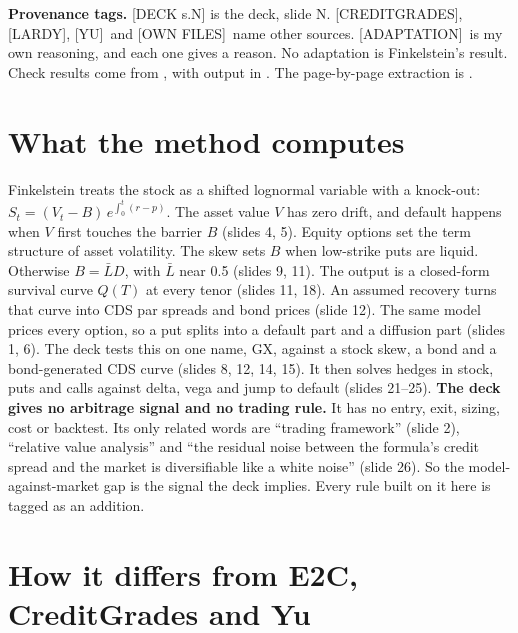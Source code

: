\documentclass[10pt,a4paper]{article}
\newcommand{\DECK}[1]{\textsf{\footnotesize\textcolor{tagdeck}{[DECK s.#1]}}}
\newcommand{\CG}{\textsf{\footnotesize\textcolor{tagother}{[CREDITGRADES]}}}
\newcommand{\LARDY}{\textsf{\footnotesize\textcolor{tagother}{[LARDY]}}}
\newcommand{\YU}{\textsf{\footnotesize\textcolor{tagother}{[YU]}}}
\newcommand{\OWN}{\textsf{\footnotesize\textcolor{tagother}{[OWN FILES]}}}
\newcommand{\ADAPT}{\textsf{\footnotesize\textcolor{tagadapt}{[ADAPTATION]}}}
\newcommand{\Lbar}{\bar{L}}
\begin{document}
\textbf{Provenance tags.} \DECK{N} is the deck, slide N. \CG, \LARDY, \YU\ and \OWN\ name other sources. \ADAPT\ is my own reasoning, and each one gives a reason. No adaptation is Finkelstein's result. Check results come from , with output in . The page-by-page extraction is .

\section{What the method computes}\label{sec:what}

Finkelstein treats the stock as a shifted lognormal variable with a knock-out: $S_t=(V_t-B)\,e^{\int_0^t(r-p)}$. The asset value $V$ has zero drift, and default happens when $V$ first touches the barrier $B$ (slides 4, 5). Equity options set the term structure of asset volatility. The skew sets $B$ when low-strike puts are liquid. Otherwise $B=\Lbar D$, with $\Lbar$ near 0.5 (slides 9, 11). The output is a closed-form survival curve $Q(T)$ at every tenor (slides 11, 18). An assumed recovery turns that curve into CDS par spreads and bond prices (slide 12). The same model prices every option, so a put splits into a default part and a diffusion part (slides 1, 6). The deck tests this on one name, GX, against a stock skew, a bond and a bond-generated CDS curve (slides 8, 12, 14, 15). It then solves hedges in stock, puts and calls against delta, vega and jump to default (slides 21--25). \textbf{The deck gives no arbitrage signal and no trading rule.} It has no entry, exit, sizing, cost or backtest. Its only related words are ``trading framework'' (slide 2), ``relative value analysis'' and ``the residual noise between the formula's credit spread and the market is diversifiable like a white noise'' (slide 26). So the model-against-market gap is the signal the deck implies. Every rule built on it here is tagged as an addition.

\section{How it differs from E2C, CreditGrades and Yu}\label{sec:diff}
\end{document}
